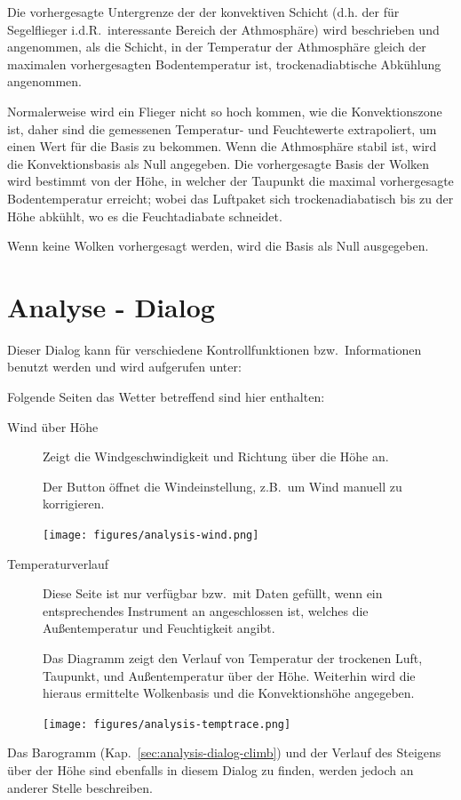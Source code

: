 Die vorhergesagte  Untergrenze der der konvektiven Schicht (d.h. der für Segelflieger i.d.R.\ interessante
Bereich der Athmosphäre) wird  beschrieben und angenommen, als die Schicht, in der Temperatur der Athmosphäre gleich der
maximalen vorhergesagten Bodentemperatur ist, trockenadiabtische Abkühlung angenommen.

Normalerweise wird ein Flieger nicht so hoch kommen, wie die Konvektionszone ist,
daher sind die gemessenen Temperatur- und Feuchtewerte extrapoliert, um einen Wert für die Basis zu bekommen.
Wenn die Athmosphäre stabil ist, wird die Konvektionsbasis als Null angegeben.
%
Die vorhergesagte Basis der Wolken wird bestimmt von der Höhe, in welcher der Taupunkt die
maximal vorhergesagte Bodentemperatur erreicht; wobei das Luftpaket sich trockenadiabatisch bis
zu der Höhe abkühlt, wo es die Feuchtadiabate schneidet.

Wenn keine Wolken vorhergesagt werden, wird die Basis als Null ausgegeben.
\section{Analyse - Dialog}
Dieser Dialog kann für verschiedene Kontrollfunktionen bzw.\ Informationen benutzt werden und wird aufgerufen unter:


Folgende Seiten das Wetter betreffend sind hier enthalten:
\begin{description}
\item[Wind über Höhe]
Zeigt die Windgeschwindigkeit und Richtung über die Höhe an.

Der Button  öffnet die Windeinstellung, z.B.\ um Wind manuell zu korrigieren.

\begin{center}
\texttt{[image: figures/analysis-wind.png]}
\end{center}
\item[Temperaturverlauf]
Diese Seite ist nur verfügbar bzw.\ mit Daten gefüllt, wenn ein entsprechendes Instrument
an  \xc angeschlossen ist, welches die Außentemperatur und Feuchtigkeit angibt.

Das Diagramm zeigt den Verlauf von Temperatur der trockenen Luft, Taupunkt, und Außentemperatur
über der Höhe. Weiterhin wird die hieraus ermittelte Wolkenbasis und die Konvektionshöhe  angegeben.

\begin{center}
\texttt{[image: figures/analysis-temptrace.png]}
\end{center}

\end{description}
Das Barogramm (Kap.~\ref{sec:analysis-dialog-climb}) und der Verlauf des Steigens über der Höhe sind
ebenfalls in diesem Dialog zu finden, werden jedoch an anderer Stelle beschreiben.

